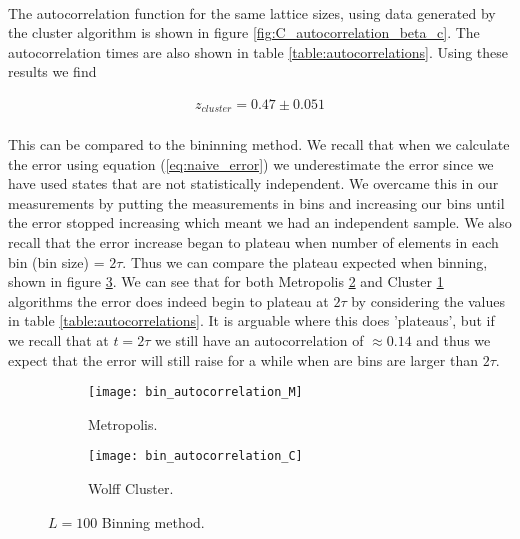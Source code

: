 \documentclass[12pt] {report} %
\begin{document}
			\paragraph{}
				The autocorrelation function for the same lattice sizes, using data generated by the cluster algorithm is shown in figure \ref{fig:C_autocorrelation_beta_c}. The autocorrelation times are also shown in table \ref{table:autocorrelations}. Using these results we find
				
			\begin{align}
				z_{cluster} = 0.47 \pm 0.051 \label{z_cluster}
			\end{align}
			
			\paragraph{}
				
			
			\paragraph{}
				This can be compared to the bininning method. We recall that when we calculate the error using equation (\ref{eq:naive_error}) we underestimate the error since we have used states that are not statistically independent. We overcame this in our measurements by putting the measurements in bins and increasing our bins until the error stopped increasing which meant we had an independent sample. We also recall that the error increase began to plateau when number of elements in  each bin (bin size) = $2\tau$. Thus we can compare the plateau expected when binning, shown in figure \ref{fig:bin_autocorrelations}. We can see that for both Metropolis \ref{fig:bin_autocorrelation_M} and Cluster \ref{fig:bin_autocorrelation_C} algorithms the error does indeed begin to plateau at $2\tau$ by considering the values in table \ref{table:autocorrelations}. It is arguable where this does 'plateaus', but if we recall that at $t = 2\tau$ we still have an autocorrelation of $\approx 0.14$ and thus we expect that the error will still raise for a while when are bins are larger than $2\tau$. 
				
			\begin{figure}[H]
				\centering
				\begin{subfigure}[h]{0.49\textwidth}
					\centering
					\texttt{[image: bin\_autocorrelation\_M]}
					\caption{Metropolis.}
					\label{fig:bin_autocorrelation_C}
				\end{subfigure}
				\hfill
				\begin{subfigure}[h]{0.49\textwidth}
					\centering
					\texttt{[image: bin\_autocorrelation\_C]}
					\caption{Wolff Cluster.}
					\label{fig:bin_autocorrelation_M}
				\end{subfigure} 
				\caption{$L=100$ Binning method.}
				\label{fig:bin_autocorrelations}
			\end{figure}
			
\end{document}
